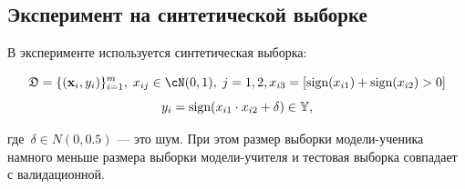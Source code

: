 \documentclass[12pt, twoside]{article}
\begin{document}
\subsection{Эксперимент на синтетической выборке}
В эксперименте используется синтетическая выборка:

$$\fD = \{(\bx_i, y_i)\}_{i=1}^{m},\; x_{ij} \in \cN(0, 1),\; j=1, 2, x_{i3} = [\text{sign}(x_{i1})+\text{sign}(x_{i2})>0]$$
$$y_i = \text{sign}(x_{i1}\cdot x_{i2}+\delta) \in \bbY,$$

\noindent
где~$\delta \in N(0, 0.5)$ --- это шум. При этом размер выборки модели-ученика намного меньше размера выборки модели-учителя и тестовая выборка совпадает с валидационной.

\end{document}
